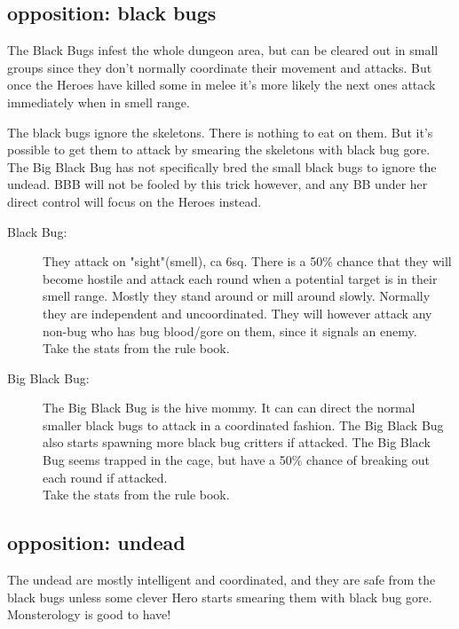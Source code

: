 \subsection*{opposition: black bugs}

The Black Bugs infest the whole dungeon area, but can be cleared out in small groups since they don't normally coordinate their movement and attacks. But once the Heroes have killed some in melee it's more likely the next ones attack immediately when in smell range.

The black bugs ignore the skeletons. There is nothing to eat on them. But it's possible to get them to attack by smearing the skeletons with black bug gore. The Big Black Bug has not specifically bred the small black bugs to ignore the undead. BBB will not be fooled by this trick however, and any BB under her direct control will focus on the Heroes instead.

\begin{description}

\item[Black Bug:] They attack on "sight"(smell), ca 6sq. There is a 50\% chance that they will become hostile and attack each round when a potential target is in their smell range. Mostly they stand around or mill around slowly. Normally they are independent and uncoordinated. They will however attack any non-bug who has bug blood/gore on them, since it signals an enemy.\\
Take the stats from the rule book.

\item[Big Black Bug:] The Big Black Bug is the hive mommy. It can can direct the normal smaller black bugs to attack in a coordinated fashion. The Big Black Bug also starts spawning more black bug critters if attacked. The Big Black Bug seems trapped in the cage, but have a 50\% chance of breaking out each round if attacked.\\
Take the stats from the rule book.

\end{description}


\subsection*{opposition: undead}

The undead are mostly intelligent and coordinated, and they are safe from the black bugs unless some clever Hero starts smearing them with black bug gore. Monsterology is good to have!

